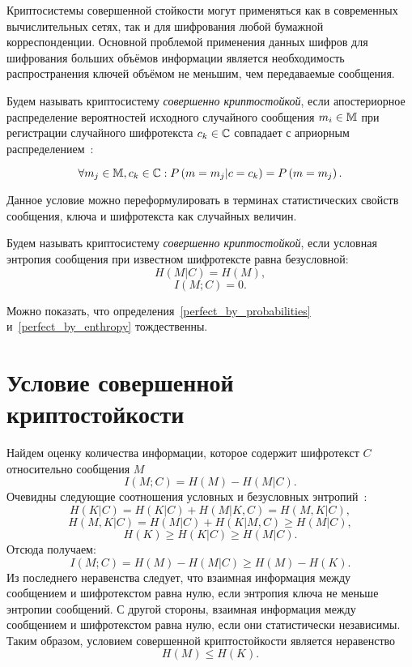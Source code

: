 Криптосистемы совершенной стойкости могут применяться как в современных вычислительных сетях, так и для шифрования любой бумажной корреспонденции. Основной проблемой применения данных шифров для шифрования больших объёмов информации является необходимость распространения ключей объёмом не меньшим, чем передаваемые сообщения.

\begin{definition}\label{perfect_by_probabilities}
Будем называть криптосистему \emph{совершенно криптостойкой}, если апостериорное распределение вероятностей исходного случайного сообщения $m_i \in \mathbb{M}$ при регистрации случайного шифротекста $c_k \in \mathbb{C}$ совпадает с априорным распределением~\cite{Gultyaeva:2010}:

	\[\forall m_j \in \mathbb{M}, c_k \in \mathbb{C}: P \left( m = m_j | c = c_k \right) = P \left( m = m_j \right).\]
\end{definition}

Данное условие можно переформулировать в терминах статистических свойств сообщения, ключа и шифротекста как случайных величин.

\begin{definition}\label{perfect_by_enthropy}
Будем называть криптосистему \emph{совершенно криптостойкой}, если условная энтропия сообщения при известном шифротексте равна безусловной:
	\[H \left( M | C \right) = H \left( M \right),\]
	\[I \left( M; C \right) = 0.\]
\end{definition}

Можно показать, что определения~\ref{perfect_by_probabilities} и~\ref{perfect_by_enthropy} тождественны.

\section[Условие]{Условие совершенной криптостойкости}

Найдем оценку количества информации, которое содержит шифротекст $C$ относительно сообщения $M$
\[ I(M; C) = H(M) - H(M | C). \]
Очевидны следующие соотношения условных и безусловных энтропий~\cite{GabPil:2007}:
\[H(K|C)=H(K|C)+H(M|K,C)=H(M,K|C),\]
\[H(M,K|C)=H(M|C)+H(K|M,C)\geq H(M|C),\]
\[H(K)\geq H(K|C)\geq H(M|C).\]
Отсюда получаем:
 \[ I(M; C) = H(M) - H(M | C)\geq H(M)-H(K). \]
Из последнего неравенства следует, что взаимная информация между сообщением и шифротекстом равна нулю, если энтропия ключа не меньше энтропии сообщений. С другой стороны, взаимная информация между сообщением и шифротекстом равна нулю, если они статистически независимы. Таким образом, условием совершенной криптостойкости является неравенство
\[ H(M) \leq H(K).\]


